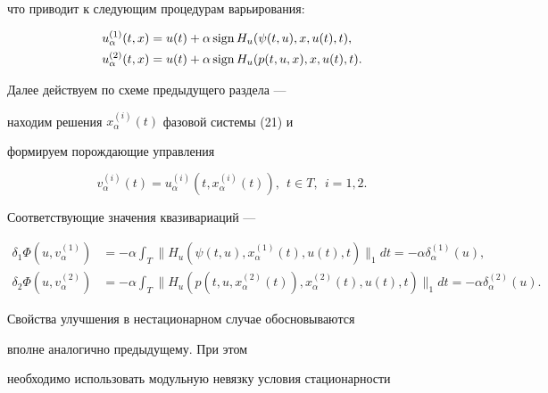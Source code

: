 что приводит к следующим процедурам варьирования:


\begin{align}


u_{\alpha}^{(1)}(t, x)&=u(t)+\alpha \sign


H_{u}(\psi(t,u), x, u(t), t),\\


u_{\alpha}^{(2)}(t, x)&=u(t)+\alpha \sign 


H_{u}(p(t,u,x), x, u(t), t).


\end{align}





Далее действуем по схеме предыдущего раздела ---


находим решения $x_{\alpha}^{(i)}(t)$ фазовой системы (21) и


формируем порождающие управления


$$


v_{\alpha}^{(i)}(t)=u_{\alpha}^{(i)}(t, x_{\alpha}^{(i)}(t)),


\ \ t\in T,\ \ i=1,2.


$$





Соответствующие значения квазивариаций ---


\begin{align*}


\delta_{1} \Phi(u, v_{\alpha}^{(1)})&=-\alpha \int_{T}


\| H_{u}(\psi(t,u), x_{\alpha}^{(1)}(t), u(t), t)\|_{1} dt=


-\alpha \delta_{\alpha}^{(1)}(u),\\


\delta_{2} \Phi(u, v_{\alpha}^{(2)})&=-\alpha \int_{T}


\| H_{u}(p(t,u,x_{\alpha}^{(2)}(t)), x_{\alpha}^{(2)}(t), u(t), t)\|_{1} dt


=-\alpha \delta_{\alpha}^{(2)}(u).


\end{align*}





Свойства улучшения в нестационарном случае обосновываются 


вполне аналогично предыдущему. При этом


необходимо использовать модульную невязку условия стационарности


$$


